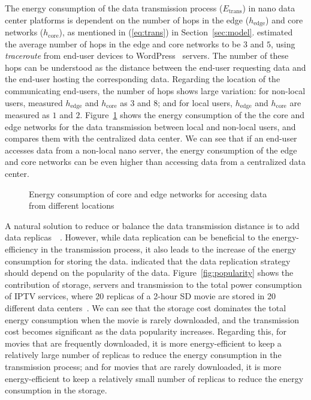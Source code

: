 The energy consumption of the data transmission process ($E_\text{trans}$) in nano data center platforms is dependent on the number of hops in the edge ($h_\text{edge}$) and core networks ($h_\text{core}$),
as mentioned in (\ref{eq:trans}) in Section~\ref{sec:model}.
\cite{DBLP:journals/sigmetrics/JalaliAVHAT14} estimated the average number of hops in the edge and core networks to be $3$ and $5$,
using \textit{traceroute} from end-user devices to WordPress~\cite{wordpress} servers.
The number of these hops can be understood as the distance between the end-user requesting data and the end-user hosting the corresponding data.
Regarding the location of the communicating end-users,
the number of hops shows large variation:
for non-local users,
\cite{DBLP:journals/sigmetrics/JalaliAVHAT14} measured $h_\text{edge}$ and $h_ \text{core}$ as $3$ and $8$;
and for local users,
$h_\text{edge}$ and $h_\text{core}$ are measured as $1$ and $2$.
Figure~\ref{fig:location} shows the energy consumption of the the core and edge networks for the data transmission between local and non-local users,
and compares them with the centralized data center.
We can see that if an end-user accesses data from a non-local nano server, 
the energy consumption of the edge and core networks can be even higher than accessing data from a centralized data center.

\begin{figure}[h]
	\fontsize{12}{12} \selectfont
	\centerline{\resizebox{5cm}{!}{}}
	\caption{Energy consumption of core and edge networks for accesing data from different locations~\cite{DBLP:journals/sigmetrics/JalaliAVHAT14}}
	\label{fig:location}
	\normalsize
\end{figure}

A natural solution to reduce or balance the data transmission distance is to add data replicas~\cite{tradeoff}~\cite{iptv}.
However,
while data replication can be beneficial to the energy-efficiency in the transmission process,
it also leads to the increase of the energy consumption for storing the data.
\cite{iptv} indicated that the data replication strategy should depend on the popularity of the data.
Figure~\ref{fig:popularity} shows the contribution of storage, servers and transmission to the total power consumption of IPTV services,
where 20 replicas of a 2-hour SD movie are stored in 20 different data centers~\cite{iptv}. 
We can see that the storage cost dominates the total energy consumption when the movie is rarely downloaded,
and the transmission cost becomes significant as the data popularity increases. 
Regarding this,
for movies that are frequently downloaded,
it is more energy-efficient to keep a relatively large number of replicas to reduce the energy consumption in the transmission process;
and for movies that are rarely downloaded,
it is more energy-efficient to keep a relatively small number of replicas to reduce the energy consumption in the storage.

